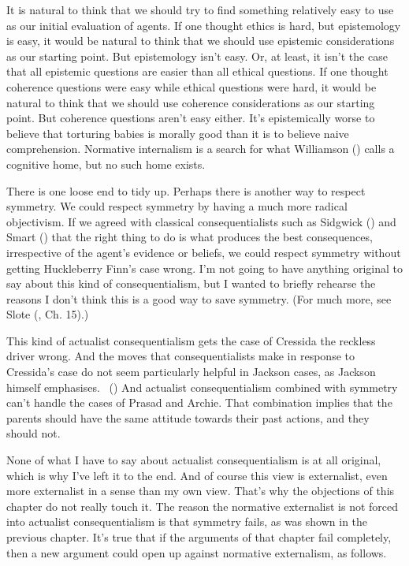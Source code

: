 \documentclass[
  10pt,
  letterpaper,
  twoside]{scrbook}
\begin{document}
It is natural to think that we should try to find something relatively
easy to use as our initial evaluation of agents. If one thought ethics
is hard, but epistemology is easy, it would be natural to think that we
should use epistemic considerations as our starting point. But
epistemology isn't easy. Or, at least, it isn't the case that all
epistemic questions are easier than all ethical questions. If one
thought coherence questions were easy while ethical questions were hard,
it would be natural to think that we should use coherence considerations
as our starting point. But coherence questions aren't easy either. It's
epistemically worse to believe that torturing babies is morally good
than it is to believe naive comprehension. Normative internalism is a
search for what Williamson () calls a
cognitive home, but no such home exists.

There is one loose end to tidy up. Perhaps there is another way to
respect symmetry. We could respect symmetry by having a much more
radical objectivism. If we agreed with classical consequentialists such
as Sidgwick () and Smart
() that the right thing to do is what
produces the best consequences, irrespective of the agent's evidence or
beliefs, we could respect symmetry without getting {Huck}leberry Finn's
case wrong. I'm not going to have anything original to say about this
kind of consequentialism, but I wanted to briefly rehearse the reasons I
don't think this is a good way to save symmetry. (For much more, see
Slote (, Ch. 15).)

This kind of actualist consequentialism gets the case of {Cressida} the
reckless driver wrong. And the moves that consequentialists make in
response to {Cressida}'s case do not seem particularly helpful in
Jackson cases, as Jackson himself emphasises.
~() And actualist
consequentialism combined with symmetry can't handle the cases of
{Prasad} and {Archie}. That combination implies that the parents should
have the same attitude towards their past actions, and they should not.

None of what I have to say about actualist consequentialism is at all
original, which is why I've left it to the end. And of course this view
is externalist, even more externalist in a sense than my own view.
That's why the objections of this chapter do not really touch it. The
reason the normative externalist is not forced into actualist
consequentialism is that symmetry fails, as was shown in the previous
chapter. It's true that if the arguments of that chapter fail
completely, then a new argument could open up against normative
externalism, as follows.
\end{document}
